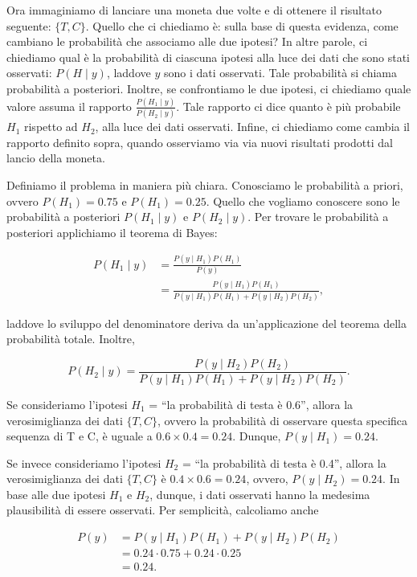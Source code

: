 \documentclass[
  11pt,
]{krantz}
\theoremstyle{definition}
\theoremstyle{definition}
\theoremstyle{definition}
\theoremstyle{definition}
\theoremstyle{remark}
\begin{document}
Ora immaginiamo di lanciare una moneta due volte e di ottenere il risultato seguente: \(\{T, C\}\). Quello che ci chiediamo è: sulla base di questa evidenza, come cambiano le probabilità che associamo alle due ipotesi? In altre parole, ci chiediamo qual è la probabilità di ciascuna ipotesi alla luce dei dati che sono stati osservati: \(P(H \mid y)\), laddove \(y\) sono i dati osservati. Tale probabilità si chiama probabilità a posteriori. Inoltre, se confrontiamo le due ipotesi, ci chiediamo quale valore assuma il rapporto \(\frac{P(H_1 \mid y)}{P(H_2 \mid y)}\). Tale rapporto ci dice quanto è più probabile \(H_1\) rispetto ad \(H_2\), alla luce dei dati osservati. Infine, ci chiediamo come cambia il rapporto definito sopra, quando osserviamo via via nuovi risultati prodotti dal lancio della moneta.

Definiamo il problema in maniera più chiara. Conosciamo le probabilità a priori, ovvero \(P(H_1) = 0.75\) e \(P(H_1) = 0.25\). Quello che vogliamo conoscere sono le probabilità a posteriori \(P(H_1 \mid y)\) e \(P(H_2 \mid y)\). Per trovare le probabilità a posteriori applichiamo il teorema di Bayes:

\[
\begin{split}
P(H_1 \mid y) &= \frac{P(y \mid H_1) P(H_1)}{P(y)} \\
&= \frac{P(y \mid H_1) P(H_1)}{P(y \mid H_1) P(H_1) + P(y \mid H_2) P(H_2)},
\end{split}
\]

laddove lo sviluppo del denominatore deriva da un'applicazione del teorema della probabilità totale. Inoltre,

\[
P(H_2 \mid y) = \frac{P(y \mid H_2) P(H_2)}{P(y \mid H_1) P(H_1) + P(y \mid H_2) P(H_2)}.
\]

Se consideriamo l'ipotesi \(H_1\) = ``la probabilità di testa è 0.6'', allora la verosimiglianza dei dati \(\{T, C\}\), ovvero la probabilità di osservare questa specifica sequenza di T e C, è uguale a \(0.6 \times 0.4 = 0.24.\) Dunque, \(P(y \mid H_1) = 0.24\).

Se invece consideriamo l'ipotesi \(H_2\) = ``la probabilità di testa è 0.4'', allora la verosimiglianza dei dati \(\{T, C\}\) è \(0.4 \times 0.6 = 0.24\), ovvero, \(P(y \mid H_2) = 0.24\). In base alle due ipotesi \(H_1\) e \(H_2\), dunque, i dati osservati hanno la medesima plausibilità di essere osservati. Per semplicità, calcoliamo anche

\[
\begin{split}
P(y) &= P(y \mid H_1) P(H_1) + P(y \mid H_2) P(H_2) \\
&= 0.24 \cdot 0.75 + 0.24 \cdot 0.25 \\
&= 0.24.
\end{split}
\]
\end{document}
